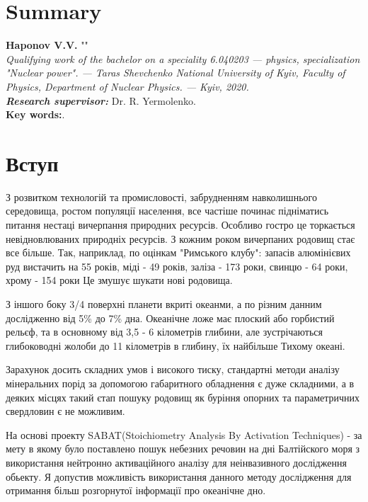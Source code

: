 \documentclass[a4paper, 14pt]{article}
\numberwithin{equation}{section}
\numberwithin{table}{section}
\begin{document}
\newpage
\thispagestyle{empty}
\section*{Summary}

{\bf Haponov V.V.} ""\\
{\itshape Qualifying work of the bachelor on a speciality 6.040203 --- physics, specialization "Nuclear power". --- Taras Shevchenko National University of Kyiv, Faculty of Physics, Department of Nuclear Physics. --- Kyiv, 2020.\\}
{\itshape \bfseries Research supervisor:} Dr. R. Yermolenko.
\\[0.5cm]
{\bf Key words:}.

\newpage
\tableofcontents
\newpage
\pagestyle{plain}
\setcounter{page}{2}
	
\newpage
\section{Вступ}

З розвитком технологій та промисловості, забрудненням навколишнього середовища, ростом популяції населення, все частіше починає підніматись питання нестаці вичерпання природних ресурсів. Особливо гостро це торкається невідновлюваних природніх ресурсів. З кожним роком вичерпаних родовищ стає все більше. Так, наприклад, по оцінкам "Римського клубу": запасів алюмінієвих руд вистачить на 55 років, міді - 49 років, заліза - 173 роки, свинцю - 64 роки, хрому - 154 роки Це змушує шукати нові родовища.

З іншого боку 3/4 поверхні планети вкриті океанми, а по різним данним дослідженно від 5\% до 7\% дна.
Океанічне ложе має плоский або горбистий рельєф, та в основному від 3,5 - 6 кілометрів глибини, але зустрічаються глибоководні жолоби до 11 кілометрів в глибину, їх найбільше Тихому океані. 

Зарахунок досить складних умов і високого тиску, стандартні методи аналізу мінеральних порід за допомогою габаритного обладнення є дуже складними, а в деяких місцях такий єтап пошуку родовищ як буріння опорних та параметричних свердловин є не можливим.

На основі проекту SABAT(Stoichiometry Analysis By Activation Techniques) - за мету в якому було поставлено пошук небезних речовин на дні Балтійского моря з використання нейтронно активаційного аналізу для неінвазивного дослідження обьекту. Я допустив можливість використання данного методу дослідження для отримання більш розгорнутої інформації про океанічне дно.	
\end{document}
